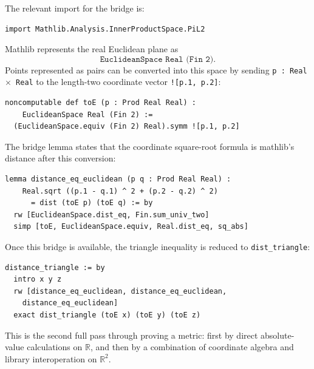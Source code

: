 \begin{example*}
The relevant import for the bridge is:
\begin{verbatim}
import Mathlib.Analysis.InnerProductSpace.PiL2
\end{verbatim}
Mathlib represents the real Euclidean plane as
\[
  \texttt{EuclideanSpace Real (Fin 2)}.
\]
Points represented as pairs can be converted into this space by sending
\texttt{p : Real \(\times\) Real} to the length-two coordinate vector
\texttt{![p.1, p.2]}:
\begin{verbatim}
noncomputable def toE (p : Prod Real Real) :
    EuclideanSpace Real (Fin 2) :=
  (EuclideanSpace.equiv (Fin 2) Real).symm ![p.1, p.2]
\end{verbatim}
The bridge lemma states that the coordinate square-root formula is mathlib's
distance after this conversion:
\begin{verbatim}
lemma distance_eq_euclidean (p q : Prod Real Real) :
    Real.sqrt ((p.1 - q.1) ^ 2 + (p.2 - q.2) ^ 2)
      = dist (toE p) (toE q) := by
  rw [EuclideanSpace.dist_eq, Fin.sum_univ_two]
  simp [toE, EuclideanSpace.equiv, Real.dist_eq, sq_abs]
\end{verbatim}
Once this bridge is available, the triangle inequality is reduced to
\texttt{dist\_triangle}:
\begin{verbatim}
distance_triangle := by
  intro x y z
  rw [distance_eq_euclidean, distance_eq_euclidean,
    distance_eq_euclidean]
  exact dist_triangle (toE x) (toE y) (toE z)
\end{verbatim}
This is the second full pass through proving a metric: first by direct
absolute-value calculations on \(\mathbb{R}\), and then by a combination of
coordinate algebra and library interoperation on \(\mathbb{R}^2\).
\end{example*}
